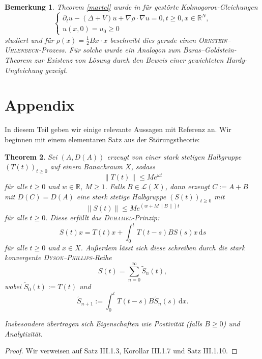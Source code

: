 \documentclass[11pt]{article}
\newtheorem{thm}{Theorem}
\theoremstyle{break}
\newtheorem{nt}[thm]{Bemerkung}
\begin{document}
\begin{nt}
Theorem \ref{martel} wurde in \cite{goldstein-goldstein-rhandi} für gestörte Kolmogorov-Gleichungen
\begin{equation}\label{perturbed}
\begin{cases}
\partial_t u - (\Delta+V) u +\nabla \rho \cdot \nabla u=0, t\ge 0, x\in \mathbb R^N,\\
u(x,0)=u_0 \ge 0
\end{cases}
\end{equation}
studiert und für $\rho(x)=\frac{1}{2} Bx\cdot x$ beschreibt dies gerade einen \textsc{Ornstein--Uhlenbeck}-Prozess.  Für solche wurde ein Analogon zum Baras--Goldstein-Theorem zur Existenz von Lösung durch den Beweis einer gewichteten Hardy-Ungleichung gezeigt.
\end{nt}
\appendix
\section{Appendix}
In diesem Teil geben wir einige relevante Aussagen mit Referenz an.  Wir beginnen mit einem elementaren Satz aus der Störungstheorie:

\vspace{.25cm}

\begin{thm}\label{bounded}
Sei $(A, D(A))$ erzeugt von einer stark stetigen Halbgruppe $(T(t))_{t\ge 0}$ auf einem Banachraum $X$, sodass
\begin{equation}
\|T(t)\|\le M e^{\omega t}
\end{equation}
f\"ur alle $t\ge 0$ und $w\in \mathbb R$, $M\ge 1$. Falls $B\in \mathcal L(X)$, dann erzeugt $C:=A+B$ mit $D(C)=D(A)$ eine stark stetige Halbgruppe $(S(t))_{t\ge 0}$ mit
\begin{equation}
\|S(t)\|\le M e^{(w+ M\|B\|) t}
\end{equation}
f\"ur alle $t\ge 0$. Diese erf\"ullt das \emph{\textsc{Duhamel}-Prinzip}:
\begin{equation}\label{duhamel}
S(t) x = T(t) x + \int_0^t T(t-s) B S(s) x \,\mathrm ds
\end{equation}
f\"ur alle $t\ge 0$ und $x\in X$. 
Außerdem lässt sich diese schreiben durch die stark konvergente \textsc{Dyson--Phillips}-Reihe
\begin{equation}
S(t)=\sum_{n=0}^\infty \tilde S_n(t),
\end{equation}
wobei $\tilde S_0(t):=T(t)$ und
\begin{equation}
\tilde S_{n+1} := \int_0^t T(t-s) B\tilde S_n(s)\, \mathrm dx.
\end{equation}

Insbesondere \"ubertragen sich Eigenschaften wie Postivit\"at (falls $B\ge 0$) und Analytizit\"at.
\end{thm}
\begin{proof}
Wir verweisen auf \cite{engel-nagel} Satz III.1.3, Korollar III.1.7 und Satz III.1.10. 
\end{proof}
\end{document}
